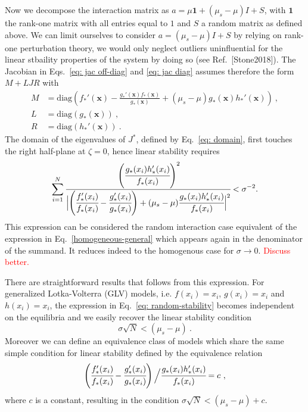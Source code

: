\documentclass[%
 reprint,
 amsmath,amssymb,
 aps,
]{revtex4-2}
\newcommand{\red}{\textcolor{red}}
\begin{document}
Now we decompose the interaction matrix as
$a = \mu \mathbf{1} + (\mu_s-\mu)I + S$,
with $\mathbf{1}$ the rank-one matrix with all entries equal to $1$
and $S$ a random matrix as defined above.
We can limit ourselves to consider 
$a = (\mu_s-\mu)I + S$ by relying on 
rank-one perturbation theory, we would only neglect outliers
uninfluential for the linear stbaility properties of the system by doing so
(see Ref.~[Stone2018]).
The Jacobian in Eqs.~\eqref{eq: jac off-diag} and \eqref{eq: jac diag} assumes therefore the form $M + LJR$ with
\begin{align}
    M & = \textrm{diag}\left(f_*'(\mathbf x) -
    \frac{g_*'(\mathbf x)f_*(\mathbf x)}{g_*(\mathbf x)}
    +(\mu_s-\mu)g_*(\mathbf x)h_*'(\mathbf x)\right) \ , \\
    L &= \textrm{diag}(g_*(\mathbf x)) \ , \\
    R &= \textrm{diag}(h_*'(\mathbf x)) \ .
\end{align}
The domain of the eigenvalues of $J^*$, defined by
Eq.~\eqref{eq: domain}, 
first touches the right half-plane at $\zeta = 0$, 
hence linear stability requires   
\begin{equation}\label{eq: random-stability}
    \sum_{i=1}^N \cfrac{\left(\cfrac{g_*(x_i)h_*'(x_i)}{f_*(x_i)}\right)^2}{
        \Bigl |\left(\cfrac{f_*'(x_i)}{f_*(x_i)} -
        \cfrac{g_*'(x_i)}{g_*(x_i)}\right)
        +(\mu_s-\mu) \cfrac{g_*(x_i)h_*'(x_i)}{f_*(x_i)} \Bigl |^2}
    < \sigma^{-2}. 
\end{equation}
This expression can be considered the
random interaction case equivalent of
the expression in Eq.~\eqref{homogeneous-general} 
which appears again in the denominator of the summand.
It reduces indeed to the homogenous case for $\sigma\to 0$.
\red{Discuss better.}

There are straightforward results 
that follows from this expression.
For generalized Lotka-Volterra (GLV) models,
i.e. $f(x_i)=x_i$, $g(x_i)=x_i$ and $h(x_i)=x_i$,
the expression in Eq.~\eqref{eq: random-stability}
becomes independent on the equilibria and we easily 
recover the linear stability condition
\begin{equation}
    \sigma\sqrt{N} < (\mu_s-\mu) \ .
\end{equation}
Moreover we can define an equivalence class of models
which share the same simple condition
for linear stability defined by the equivalence relation
\begin{equation}\label{eq: equiv class glv}
    \left(\cfrac{f_*'(x_i)}{f_*(x_i)} -
        \cfrac{g_*'(x_i)}{g_*(x_i)}\right)\Bigl/
        \cfrac{g_*(x_i)h_*'(x_i)}{f_*(x_i)}=c \ ,
\end{equation}
where $c$ is a constant,
resulting in the condition $\sigma\sqrt{N} < (\mu_s-\mu) +c$.
\end{document}
